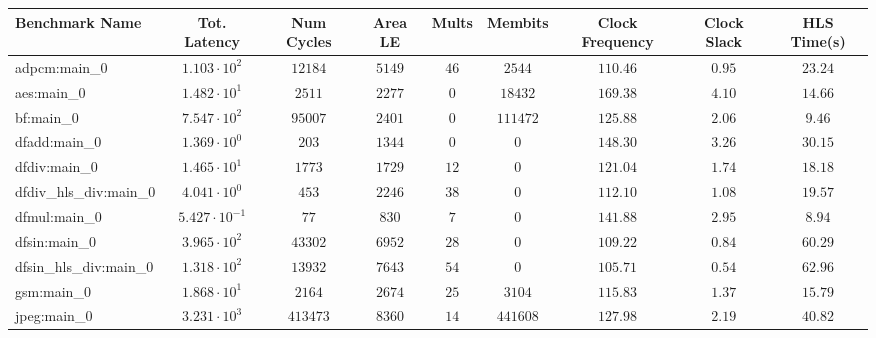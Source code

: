 \begin{tabular}{|l|c|c|c|c|c|c|c|c|}
\hline
Benchmark Name          & Tot. Latency            & Num Cycles & Area LE   & Mults   & Membits    & Clock Frequency & Clock Slack & HLS Time(s) \\
\hline
adpcm:main\_0           & $ 1.103 \cdot 10^{2}  $ & $ 12184  $ & $ 5149  $ & $ 46  $ & $ 2544   $ & $ 110.46      $ & $ 0.95    $ & $ 23.24   $ \\
aes:main\_0             & $ 1.482 \cdot 10^{1}  $ & $ 2511   $ & $ 2277  $ & $ 0   $ & $ 18432  $ & $ 169.38      $ & $ 4.10    $ & $ 14.66   $ \\
bf:main\_0              & $ 7.547 \cdot 10^{2}  $ & $ 95007  $ & $ 2401  $ & $ 0   $ & $ 111472 $ & $ 125.88      $ & $ 2.06    $ & $ 9.46    $ \\
dfadd:main\_0           & $ 1.369 \cdot 10^{0}  $ & $ 203    $ & $ 1344  $ & $ 0   $ & $ 0      $ & $ 148.30      $ & $ 3.26    $ & $ 30.15   $ \\
dfdiv:main\_0           & $ 1.465 \cdot 10^{1}  $ & $ 1773   $ & $ 1729  $ & $ 12  $ & $ 0      $ & $ 121.04      $ & $ 1.74    $ & $ 18.18   $ \\
dfdiv\_hls\_div:main\_0 & $ 4.041 \cdot 10^{0}  $ & $ 453    $ & $ 2246  $ & $ 38  $ & $ 0      $ & $ 112.10      $ & $ 1.08    $ & $ 19.57   $ \\
dfmul:main\_0           & $ 5.427 \cdot 10^{-1} $ & $ 77     $ & $ 830   $ & $ 7   $ & $ 0      $ & $ 141.88      $ & $ 2.95    $ & $ 8.94    $ \\
dfsin:main\_0           & $ 3.965 \cdot 10^{2}  $ & $ 43302  $ & $ 6952  $ & $ 28  $ & $ 0      $ & $ 109.22      $ & $ 0.84    $ & $ 60.29   $ \\
dfsin\_hls\_div:main\_0 & $ 1.318 \cdot 10^{2}  $ & $ 13932  $ & $ 7643  $ & $ 54  $ & $ 0      $ & $ 105.71      $ & $ 0.54    $ & $ 62.96   $ \\
gsm:main\_0             & $ 1.868 \cdot 10^{1}  $ & $ 2164   $ & $ 2674  $ & $ 25  $ & $ 3104   $ & $ 115.83      $ & $ 1.37    $ & $ 15.79   $ \\
jpeg:main\_0            & $ 3.231 \cdot 10^{3}  $ & $ 413473 $ & $ 8360  $ & $ 14  $ & $ 441608 $ & $ 127.98      $ & $ 2.19    $ & $ 40.82   $ \\

\end{tabular}
